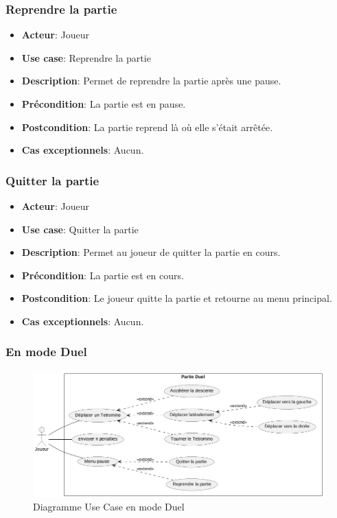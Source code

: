 \documentclass{article}
\begin{document}
\subsubsection*{Reprendre la partie}
\begin{itemize}
    \item \textbf{Acteur}: Joueur
    \item \textbf{Use case}: Reprendre la partie
    \item \textbf{Description}: Permet de reprendre la partie après une pause.
    \item \textbf{Précondition}: La partie est en pause.
    \item \textbf{Postcondition}: La partie reprend là où elle s'était arrêtée.
    \item \textbf{Cas exceptionnels}: Aucun.
\end{itemize}

\subsubsection*{Quitter la partie}
\begin{itemize}
    \item \textbf{Acteur}: Joueur
    \item \textbf{Use case}: Quitter la partie
    \item \textbf{Description}: Permet au joueur de quitter la partie en cours.
    \item \textbf{Précondition}: La partie est en cours.
    \item \textbf{Postcondition}: Le joueur quitte la partie et retourne au menu principal.
    \item \textbf{Cas exceptionnels}: Aucun.
\end{itemize}

\subsubsection{En mode Duel}

\begin{figure}[!h]
    \centering
    \includegraphics[width=1\textwidth]{uml/usescase/en-jeu/dual.png}
    \caption{Diagramme Use Case en mode Duel}
    \label{fig:Duel}
\end{figure}
\end{document}
